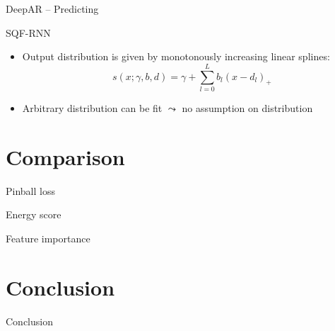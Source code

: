 \documentclass[10pt,aspectratio=169]{beamer}
\begin{document}
\begin{frame}[fragile]{DeepAR -- Predicting}
\begin{center}
    \end{center}
    \begin{itemize}
    \end{itemize}
\end{frame}

\begin{frame}{SQF-RNN}
    \begin{itemize}
        \item Output distribution is given by monotonously increasing linear splines: 
        \[ s(x; \gamma, b, d) = \gamma + \sum_{l=0}^L b_l (x - d_l)_+ \]
        \item Arbitrary distribution can be fit \(\leadsto\) no assumption on distribution
    \end{itemize}
\end{frame}

\section{Comparison}

\begin{frame}{Pinball loss}
    
\end{frame}

\begin{frame}{Energy score}
    
\end{frame}

\begin{frame}{Feature importance}
    
\end{frame}

\section{Conclusion}

\begin{frame}{Conclusion}
    
\end{frame}
\end{document}
